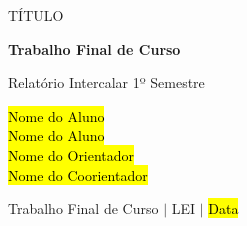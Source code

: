 \begin{titlepage}
    \BgThispage
    \centering
    \vspace*{7cm}
    
    {\fontsize{50}{1.15}\selectfont TÍTULO}
    \vspace{3cm}

    {\fontsize{29}{1.15}\selectfont
        \textbf{Trabalho Final de Curso}\\
    }

    \vspace{1\baselineskip}
    {\fontsize{14}{1.15}\selectfont
        Relatório Intercalar 1º Semestre
    }

    \vspace{5.5cm}
    {\fontsize{10}{16}\selectfont
        \hl{Nome do Aluno}\\
        \hl{Nome do Aluno}\\
        \hl{Nome do Orientador}\\
        \hl{Nome do Coorientador}

        \vspace{0.3cm}
        Trabalho Final de Curso $|$ LEI $|$ \hl{Data}
    }
\end{titlepage}